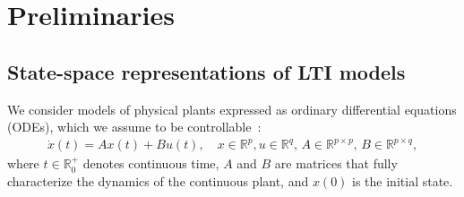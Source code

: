 \documentclass[a4paper,UKenglish]{lipics-v2018}
\newcommand{\mat}[1]{{#1}}
\renewcommand{\vec}[1]{{#1}}
\begin{document}
\section{Preliminaries}
\label{sec:preliminaries}

\subsection{State-space representations of LTI models}
\label{sec:model}


We consider models of physical plants expressed as ordinary differential
equations (ODEs), which we assume to be controllable~\cite{Astrom08,
astrom1997computer}:
%
\begin{align}
\label{eq:ode1}
\dot{x}(t) = \mat{A}\vec{x}(t)+ \mat{B} \vec{u}(t), \quad 
\vec{x} \in \mathbb{R}^p, \vec{u} \in \mathbb{R}^q,\,
\mat{A} \in \mathbb{R}^{p \times p},\,
\mat{B} \in \mathbb{R}^{p \times q},
\end{align}
%
where $t \in \mathbb R_0^+$ denotes continuous time, $\mat{A}$ and $\mat{B}$
are matrices that fully characterize the dynamics of the continuous plant,
and $x(0)$ is the initial state.
\end{document}
